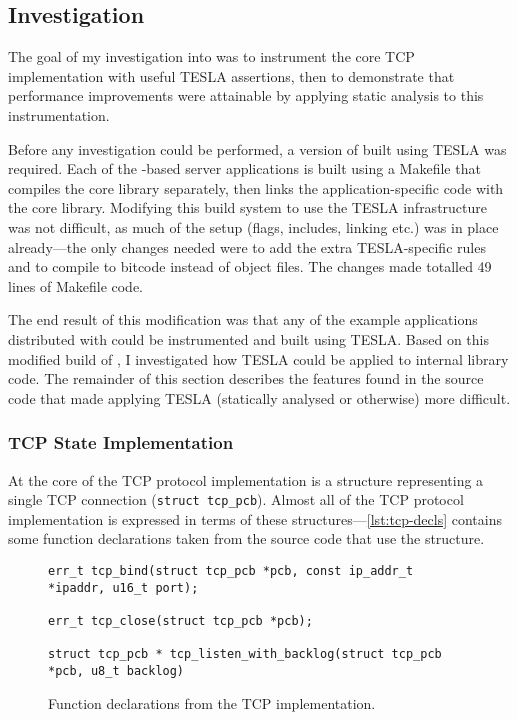 \subsection{Investigation}

The goal of my investigation into \lwip{} was to instrument the core TCP
implementation with useful TESLA assertions, then to demonstrate that
performance improvements were attainable by applying static analysis to
this instrumentation.

Before any investigation could be performed, a version of \lwip{} built using TESLA
was required. Each of the \lwip{}-based server applications is built using a
Makefile that compiles the core library separately, then links the
application-specific code with the core library. Modifying this build system to
use the TESLA infrastructure was not difficult, as much of the setup (flags,
includes, linking etc.) was in place already---the only changes needed were to
add the extra TESLA-specific rules and to compile to bitcode instead of object
files. The changes made totalled 49 lines of Makefile code.

The end result of this modification was that any of the example applications
distributed with \lwip{} could be instrumented and built using TESLA. Based on
this modified build of \lwip{}, I investigated how TESLA could be applied to
internal library code. The remainder of this section describes the features
found in the source code that made applying TESLA (statically analysed or
otherwise) more difficult.

\subsubsection{TCP State Implementation}

At the core of the TCP protocol implementation is a structure
representing a single TCP connection (\texttt{struct tcp_pcb}).
Almost all of the TCP protocol implementation is expressed in terms of
these structures---\autoref{lst:tcp-decls} contains some function
declarations taken from the source code that use the structure.

\begin{figure}
  \begin{verbatim}
err_t tcp_bind(struct tcp_pcb *pcb, const ip_addr_t *ipaddr, u16_t port);

err_t tcp_close(struct tcp_pcb *pcb);

struct tcp_pcb * tcp_listen_with_backlog(struct tcp_pcb *pcb, u8_t backlog)
  \end{verbatim}
  \caption{Function declarations from the \lwip{} TCP implementation.}
  \label{lst:tcp-decls}
\end{figure}


